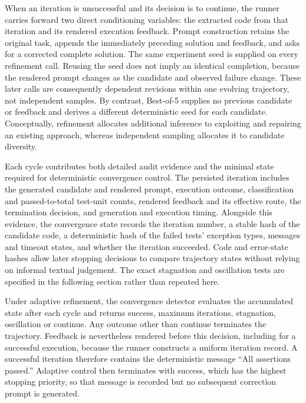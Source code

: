 When an iteration is unsuccessful and its decision is to continue, the runner carries forward two direct conditioning variables: the extracted code from that iteration and its rendered execution feedback. Prompt construction retains the original task, appends the immediately preceding solution and feedback, and asks for a corrected complete solution. The same experiment seed is supplied on every refinement call. Reusing the seed does not imply an identical completion, because the rendered prompt changes as the candidate and observed failure change. These later calls are consequently dependent revisions within one evolving trajectory, not independent samples. By contrast, Best-of-5 supplies no previous candidate or feedback and derives a different deterministic seed for each candidate. Conceptually, refinement allocates additional inference to exploiting and repairing an existing approach, whereas independent sampling allocates it to candidate diversity.

Each cycle contributes both detailed audit evidence and the minimal state required for deterministic convergence control. The persisted iteration includes the generated candidate and rendered prompt, execution outcome, classification and passed-to-total test-unit counts, rendered feedback and its effective route, the termination decision, and generation and execution timing. Alongside this evidence, the convergence state records the iteration number, a stable hash of the candidate code, a deterministic hash of the failed tests' exception types, messages and timeout states, and whether the iteration succeeded. Code and error-state hashes allow later stopping decisions to compare trajectory states without relying on informal textual judgement. The exact stagnation and oscillation tests are specified in the following section rather than repeated here.

Under adaptive refinement, the convergence detector evaluates the accumulated state after each cycle and returns success, maximum iterations, stagnation, oscillation or continue. Any outcome other than continue terminates the trajectory. Feedback is nevertheless rendered before this decision, including for a successful execution, because the runner constructs a uniform iteration record. A successful iteration therefore contains the deterministic message ``All assertions passed.'' Adaptive control then terminates with success, which has the highest stopping priority, so that message is recorded but no subsequent correction prompt is generated.


